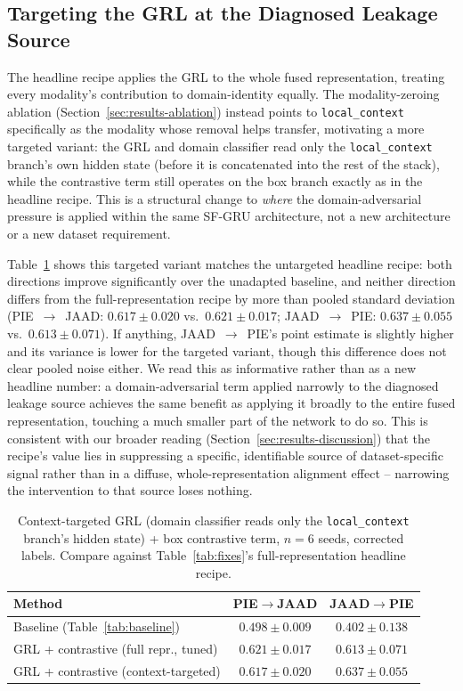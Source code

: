 \subsection{Targeting the GRL at the Diagnosed Leakage Source}
\label{sec:results-context}

The headline recipe applies the GRL to the whole fused representation,
treating every modality's contribution to domain-identity equally. The
modality-zeroing ablation (Section~\ref{sec:results-ablation}) instead
points to \texttt{local\_context} specifically as the modality whose
removal helps transfer, motivating a more targeted variant: the GRL and
domain classifier read only the \texttt{local\_context} branch's own
hidden state (before it is concatenated into the rest of the stack),
while the contrastive term still operates on the box branch exactly as
in the headline recipe. This is a structural change to \emph{where} the
domain-adversarial pressure is applied within the same SF-GRU
architecture, not a new architecture or a new dataset requirement.

Table~\ref{tab:context} shows this targeted variant matches the
untargeted headline recipe: both directions improve significantly over
the unadapted baseline, and neither direction differs from the
full-representation recipe by more than pooled standard deviation
(PIE~$\to$~JAAD: $0.617\pm0.020$ vs.\ $0.621\pm0.017$;
JAAD~$\to$~PIE: $0.637\pm0.055$ vs.\ $0.613\pm0.071$). If anything,
JAAD~$\to$~PIE's point estimate is slightly higher and its variance
is lower for the targeted variant, though this difference does not
clear pooled noise either. We read this as informative rather than as
a new headline number: a domain-adversarial term applied narrowly to
the diagnosed leakage source achieves the same benefit as applying it
broadly to the entire fused representation, touching a much smaller
part of the network to do so. This is consistent with our broader
reading (Section~\ref{sec:results-discussion}) that the recipe's value
lies in suppressing a specific, identifiable source of dataset-specific
signal rather than in a diffuse, whole-representation alignment effect
-- narrowing the intervention to that source loses nothing.

\begin{table}[t]
\centering
\caption{Context-targeted GRL (domain classifier reads only the
\texttt{local\_context} branch's hidden state) + box contrastive term,
$n=6$ seeds, corrected labels. Compare against Table~\ref{tab:fixes}'s
full-representation headline recipe.}
\label{tab:context}
\begin{tabular}{lcc}
\toprule
Method & PIE$\to$JAAD & JAAD$\to$PIE \\
\midrule
Baseline (Table~\ref{tab:baseline}) & $0.498\pm0.009$ & $0.402\pm0.138$ \\
GRL + contrastive (full repr., tuned) & $0.621\pm0.017$ & $0.613\pm0.071$ \\
GRL + contrastive (context-targeted) & $0.617\pm0.020$ & $0.637\pm0.055$ \\
\bottomrule
\end{tabular}
\end{table}

